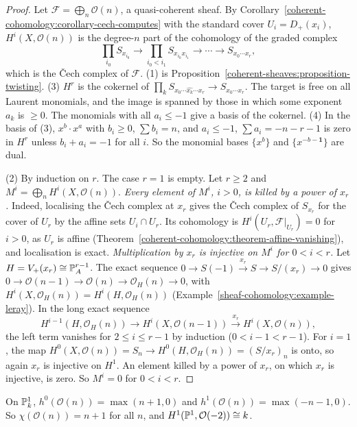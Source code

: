 \begin{proof}
Let $\mathcal{F} = \bigoplus_n\mathcal{O}(n)$, a quasi-coherent sheaf. By Corollary~\ref{coherent-cohomology:corollary-cech-computes} with the standard cover
$U_i = D_+(x_i)$, $H^i(X, \mathcal{O}(n))$ is the degree-$n$ part of the cohomology of the graded complex
\[
\prod_{i_0}S_{x_{i_0}} \to \prod_{i_0 < i_1}S_{x_{i_0}x_{i_1}} \to \cdots \to S_{x_0 \cdots x_r},
\]
which is the \v{C}ech complex of $\mathcal{F}$. (1) is Proposition~\ref{coherent-sheaves:proposition-twisting}. (3) $H^r$ is the cokernel of $\prod_kS_{x_0 \cdots \widehat{x_k} \cdots x_r} \to S_{x_0 \cdots x_r}$. The
target is free on all Laurent monomials, and the image is spanned by those in which some exponent $a_k$ is $\geq 0$. The monomials with all $a_i \leq -1$ give a
basis of the cokernel. (4) In the basis of (3), $x^b \cdot x^{a}$ with $b_i \geq 0$, $\sum b_i = n$, and $a_i \leq -1$, $\sum a_i = -n-r-1$ is zero in $H^r$ unless
$b_i + a_i = -1$ for all $i$. So the monomial bases $\{x^b\}$ and $\{x^{-b-\mathbf{1}}\}$ are dual.

(2) By induction on $r$. The case $r = 1$ is empty. Let $r \geq 2$ and $M^i = \bigoplus_nH^i(X, \mathcal{O}(n))$. \emph{Every element of $M^i$, $i > 0$, is killed by a power of
$x_r$.} Indeed, localising the \v{C}ech complex at $x_r$ gives the \v{C}ech complex of $S_{x_r}$ for the cover of $U_r$ by the affine sets $U_i \cap U_r$. Its
cohomology is $H^i(U_r, \mathcal{F}|_{U_r}) = 0$ for $i > 0$, as $U_r$ is affine (Theorem~\ref{coherent-cohomology:theorem-affine-vanishing}), and localisation is exact.
\emph{Multiplication by $x_r$ is injective on $M^i$ for $0 < i < r$.} Let $H = V_+(x_r) \cong \mathbb{P}^{r-1}_A$. The exact sequence
$0 \to S(-1) \xrightarrow{x_r} S \to S/(x_r) \to 0$ gives $0 \to \mathcal{O}(n-1) \to \mathcal{O}(n) \to \mathcal{O}_H(n) \to 0$, with $H^i(X, \mathcal{O}_H(n)) = H^i(H, \mathcal{O}_H(n))$
(Example~\ref{sheaf-cohomology:example-leray}). In the long exact sequence
\[
H^{i-1}(H, \mathcal{O}_H(n)) \to H^i(X, \mathcal{O}(n-1)) \xrightarrow{x_r} H^i(X, \mathcal{O}(n)),
\]
the left term vanishes for $2 \leq i \leq r - 1$ by induction ($0 < i - 1 < r - 1$). For $i = 1$, the map $H^0(X, \mathcal{O}(n)) = S_n \to H^0(H, \mathcal{O}_H(n)) = (S/x_r)_n$ is
onto, so again $x_r$ is injective on $H^1$. An element killed by a power of $x_r$, on which $x_r$ is injective, is zero. So $M^i = 0$ for $0 < i < r$.
\end{proof}

\begin{corollary}\label{coherent-cohomology:corollary-p1}
On $\mathbb{P}^1_k$, $h^0(\mathcal{O}(n)) = \max(n + 1, 0)$ and $h^1(\mathcal{O}(n)) = \max(-n - 1, 0)$. So $\chi(\mathcal{O}(n)) = n + 1$ for all $n$, and $H^1(\mathbb{P}^1, \mathcal{O}(-2)) \cong k$.
\end{corollary}

